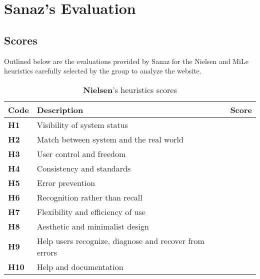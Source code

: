 \documentclass{article}
\begin{document}
\section{Sanaz's Evaluation}
\subsection{Scores}
Outlined below are the evaluations provided by Sanaz for the Nielsen and MiLe heuristics carefully selected by the group to analyze the website.\\
\begin{table}[htp!]
    \centering
    \begin{tabular}{ |l|l|c| }
        \hline
        \textbf{Code} & \textbf{Description} & \textbf{Score}\\
        \hline
        \textbf{H1} & Visibility of system status & \textbf{\color{unicefOrange}{3}}\\
        \hline
        \textbf{H2} & Match between system and the real world & \textbf{\color{unicefGreen}{4}}\\
        \hline
        \textbf{H3} & User control and freedom & \textbf{\color{unicefOrange}{3}}\\
        \hline
        \textbf{H4} & Consistency and standards & \textbf{\color{unicefGreen}{4}}\\
        \hline
        \textbf{H5} & Error prevention & \textbf{\color{unicefGreen}{4.5}}\\
        \hline
        \textbf{H6} & Recognition rather than recall & \textbf{\color{unicefGreen}{4.5}}\\
        \hline
        \textbf{H7} & Flexibility and efficiency of use & \textbf{\color{unicefOrange}{3.5}}\\
        \hline
        \textbf{H8} & Aesthetic and minimalist design & \textbf{\color{unicefGreen}{4}}\\
        \hline
        \textbf{H9} & Help users recognize, diagnose and recover from errors & \textbf{\color{unicefGreen}{4.5}}\\
        \hline
        \textbf{H10} & Help and documentation & \textbf{\color{unicefGreen}{4}}\\
        \hline
    \end{tabular}
    \caption{\textbf{Nielsen}'s heuristics scores}
\end{table}
\end{document}
